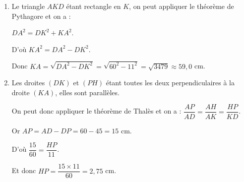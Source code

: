 
\medskip

\begin{enumerate}
  \item Le triangle $AKD$ étant rectangle en $K$, on peut appliquer le théorème de Pythagore et on a :
  
$DA^2 = DK^2 + KA^2$.
  
D'où $KA^2 = DA^2 - DK^2$.
  
Donc $KA = \sqrt{DA^2-DK^2} = \sqrt{60^2-11^2} = \sqrt{3479} \approx 59,0$ cm.
  \item Les droites $(DK)$ et $(PH)$ étant toutes les deux perpendiculaires à la droite $(KA)$, elles sont parallèles.
  
  On peut donc appliquer le théorème de Thalès et on a : $\dfrac{AP}{AD}=\dfrac{AH}{AK}=\dfrac{HP}{KD}$.
  
Or $AP = AD - DP = 60 - 45 = 15$ cm.
  
D'où $\dfrac{15}{60}=\dfrac{HP}{11}$.
  
Et donc $HP = \dfrac{15 \times 11}{60} = 2,75$ cm.
\end{enumerate}

\medskip

